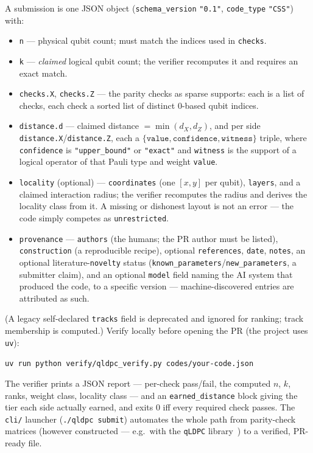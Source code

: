 \documentclass[11pt]{article}
\begin{document}
	A submission is one JSON object (\texttt{schema\_version} \texttt{"0.1"},
	\texttt{code\_type} \texttt{"CSS"}) with:
	\begin{itemize}[nosep]
		\item \texttt{n} --- physical qubit count; must match the indices used
		in \texttt{checks}.
		\item \texttt{k} --- \emph{claimed} logical qubit count; the verifier
		recomputes it and requires an exact match.
		\item \texttt{checks.X}, \texttt{checks.Z} --- the parity checks as
		sparse supports: each is a list of checks, each check a sorted list of
		distinct $0$-based qubit indices.
		\item \texttt{distance.d} --- claimed distance $=\min(d_X,d_Z)$, and
		per side \texttt{distance.X}/\texttt{distance.Z}, each a
		$\{\texttt{value},\texttt{confidence},\texttt{witness}\}$ triple,
		where \texttt{confidence} is \texttt{"upper\_bound"} or
		\texttt{"exact"} and \texttt{witness} is the support of a logical
		operator of that Pauli type and weight \texttt{value}.
		\item \texttt{locality} (optional) --- \texttt{coordinates} (one
		$[x,y]$ per qubit), \texttt{layers}, and a claimed interaction
		radius; the verifier recomputes the radius and derives the locality
		class from it. A missing or dishonest layout is not an error --- the
		code simply competes as \texttt{unrestricted}.
		\item \texttt{provenance} --- \texttt{authors} (the humans; the PR
		author must be listed), \texttt{construction} (a reproducible recipe),
		optional \texttt{references}, \texttt{date}, \texttt{notes}, an
		optional literature-\texttt{novelty} status
		(\texttt{known\_parameters}/\texttt{new\_parameters}, a submitter
		claim), and an optional \texttt{model} field naming the AI system that
		produced the code, to a specific version --- machine-discovered
		entries are attributed as such.
	\end{itemize}
	(A legacy self-declared \texttt{tracks} field is deprecated and ignored
	for ranking; track membership is computed.) Verify locally before opening
	the PR (the project uses \texttt{uv}):
	\begin{center}
		\texttt{uv run python verify/qldpc\_verify.py codes/your-code.json}
	\end{center}
	The verifier prints a JSON report --- per-check pass/fail, the computed
	$n$, $k$, ranks, weight class, locality class --- and an
	\texttt{earned\_distance} block giving the tier each side actually earned,
	and exits $0$ iff every required check passes. The
	\texttt{cli/} launcher (\texttt{./qldpc submit}) automates the whole path
	from parity-check matrices (however constructed --- e.g.\ with the
	\texttt{qLDPC} library~\cite{perlin2023qldpc}) to a verified, PR-ready
	file.
\end{document}
